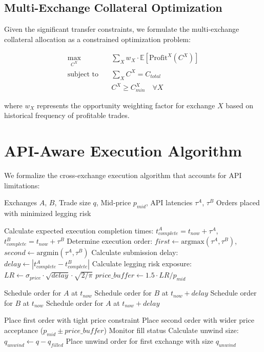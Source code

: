 \documentclass{article}
\begin{document}
\subsection{Multi-Exchange Collateral Optimization}

Given the significant transfer constraints, we formulate the multi-exchange collateral allocation as a constrained optimization problem:

\begin{align}
\max_{C^X} \quad & \sum_{X} w_X \cdot \mathbb{E}[\text{Profit}^X(C^X)] \\
\text{subject to} \quad & \sum_{X} C^X = C_{total} \\
& C^X \geq C_{min}^X \quad \forall X
\end{align}

where $w_X$ represents the opportunity weighting factor for exchange $X$ based on historical frequency of profitable trades.

\section{API-Aware Execution Algorithm}

We formalize the cross-exchange execution algorithm that accounts for API limitations:

\begin{algorithm}
\caption{API-Constrained Cross-Exchange Execution}
\begin{algorithmic}[1]
\REQUIRE Exchanges $A$, $B$, Trade size $q$, Mid-price $p_{mid}$, API latencies $\tau^A$, $\tau^B$
\ENSURE Orders placed with minimized legging risk

\STATE Calculate expected execution completion times: $t_{complete}^A = t_{now} + \tau^A$, $t_{complete}^B = t_{now} + \tau^B$
\STATE Determine execution order: $first \gets \text{argmax}(\tau^A, \tau^B)$, $second \gets \text{argmin}(\tau^A, \tau^B)$
\STATE Calculate submission delay: $delay \gets |t_{complete}^A - t_{complete}^B|$
\STATE Calculate legging risk exposure: $LR \gets \sigma_{price} \cdot \sqrt{delay} \cdot \sqrt{2/\pi}$
\STATE $price\_buffer \gets 1.5 \cdot LR / p_{mid}$ 

    \STATE Schedule order for $A$ at $t_{now}$
    \STATE Schedule order for $B$ at $t_{now} + delay$
\ELSE
    \STATE Schedule order for $B$ at $t_{now}$
    \STATE Schedule order for $A$ at $t_{now} + delay$
\ENDIF

\STATE Place first order with tight price constraint
\STATE Place second order with wider price acceptance ($p_{mid} \pm price\_buffer$)
\STATE Monitor fill status
    \STATE Calculate unwind size: $q_{unwind} \gets q - q_{filled}$
    \STATE Place unwind order for first exchange with size $q_{unwind}$
\ENDIF
\end{algorithmic}
\end{algorithm}
\end{document}
